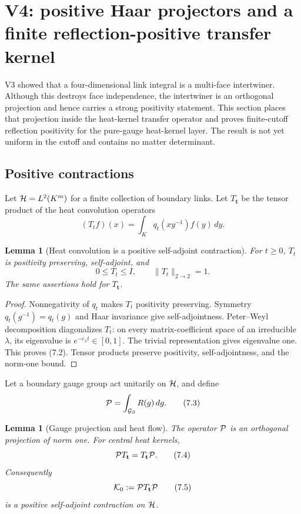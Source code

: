 \documentclass[11pt]{article}
\newtheorem{lemma}[theorem]{Lemma}
\theoremstyle{remark}
\begin{document}
\section{V4: positive Haar projectors and a finite reflection-positive transfer kernel}
\label{sec:v19v4}

V3 showed that a four-dimensional link integral is a multi-face
intertwiner.  Although this destroys face independence, the intertwiner is
an orthogonal projection and hence carries a strong positivity statement.
This section places that projection inside the heat-kernel transfer
operator and proves finite-cutoff reflection positivity for the pure-gauge
heat-kernel layer.  The result is not yet uniform in the cutoff and contains
no matter determinant.

\subsection{Positive contractions}

Let \({\cal H}=L^2(K^m)\) for a finite collection of boundary links.  Let
\(T_{\mathbf t}\) be the tensor product of the heat convolution operators
\[
 (T_tf)(x)=\int_Kq_t(xy^{-1})f(y)\,dy.                     \tag{7.1}
\]

\begin{lemma}[Heat convolution is a positive self-adjoint contraction]
\label{lem:v19v4-heat-positive}
For \(t\ge0\), \(T_t\) is positivity preserving,
self-adjoint, and
\[
 0\le T_t\le I,\qquad \|T_t\|_{2\to2}=1.                  \tag{7.2}
\]
The same assertions hold for \(T_{\mathbf t}\).
\end{lemma}

\begin{proof}
Nonnegativity of \(q_t\) makes \(T_t\) positivity preserving.  Symmetry
\(q_t(g^{-1})=q_t(g)\) and Haar invariance give self-adjointness.
Peter--Weyl decomposition diagonalizes \(T_t\): on every matrix-coefficient
space of an irreducible \(\lambda\), its eigenvalue is
\(e^{-c_\lambda t}\in[0,1]\).  The trivial representation gives eigenvalue
one.  This proves (7.2).  Tensor products preserve positivity,
self-adjointness, and the norm-one bound.
\end{proof}

Let a boundary gauge group act unitarily on \({\cal H}\), and define
\[
 {\cal P}=\int_{{\cal G}_{\partial}}R(g)\,dg.              \tag{7.3}
\]

\begin{lemma}[Gauge projection and heat flow]
\label{lem:v19v4-gauge-projection}
The operator \({\cal P}\) is an orthogonal projection of norm one.
For central heat kernels,
\[
 {\cal P}T_{\mathbf t}=T_{\mathbf t}{\cal P}.              \tag{7.4}
\]
Consequently
\[
 {\cal K}_0:={\cal P}T_{\mathbf t}{\cal P}                \tag{7.5}
\]
is a positive self-adjoint contraction on \({\cal H}\).
\end{lemma}
\end{document}
